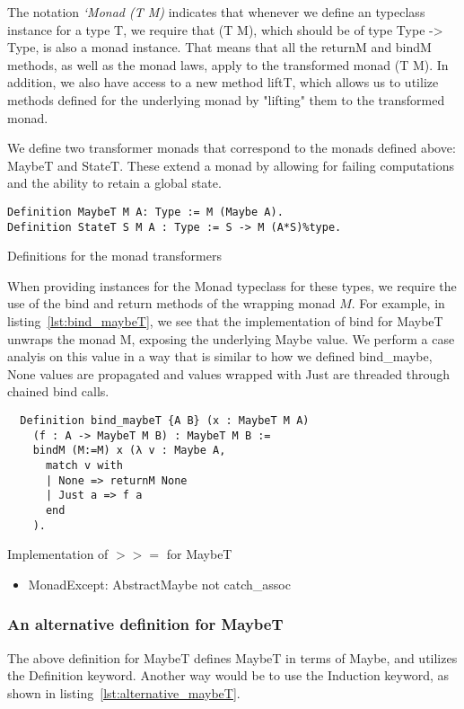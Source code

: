 The notation \textit{`Monad (T M)} indicates that whenever we define an
typeclass instance for a type T, we require that (T M), which should be of type
Type -> Type, is also a monad instance. That means that all the returnM and
bindM methods, as well as the monad laws, apply to the transformed monad (T M).
In addition, we also have access to a new method liftT, which allows us to
utilize methods defined for the underlying monad by "lifting" them to the
transformed monad. 

We define two transformer monads that correspond to the monads defined above:
MaybeT and StateT. These extend a monad by allowing for failing computations
and the ability to retain a global state. 

\begin{listing}
\begin{verbatim}
Definition MaybeT M A: Type := M (Maybe A).
Definition StateT S M A : Type := S -> M (A*S)%type.
\end{verbatim}
\caption{Definitions for the monad transformers}
\end{listing}

When providing instances for the Monad typeclass for these types, we require
the use of the bind and return methods of the wrapping monad $M$.
For example, in listing~\ref{lst:bind_maybeT}, we see that the implementation 
of  bind for MaybeT
unwraps the monad M, exposing the underlying Maybe value. We perform a case
analyis on this value in a way that is similar to how we defined bind\_maybe,
None values are propagated and values wrapped with Just are threaded through
chained bind calls.

\begin{listing}
\begin{verbatim}
  Definition bind_maybeT {A B} (x : MaybeT M A) 
    (f : A -> MaybeT M B) : MaybeT M B :=
    bindM (M:=M) x (λ v : Maybe A,
      match v with
      | None => returnM None
      | Just a => f a
      end
    ).
\end{verbatim}
\caption{Implementation of $>>=$ for MaybeT}
\label{lst:bind_maybeT}
\end{listing}

\begin{itemize}
    \item {MonadExcept: AbstractMaybe not catch\_assoc}
\end{itemize}

\subsubsection{An alternative definition for MaybeT}
The above definition for MaybeT defines MaybeT in terms of Maybe, and utilizes
the Definition keyword. Another way would be to use the Induction keyword, as
shown in listing~\ref{lst:alternative_maybeT}.

